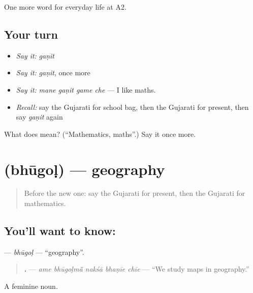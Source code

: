 \begin{grammarlens}[title={What you've built}]
One more word for everyday life at A2.
\end{grammarlens}

\subsection*{Your turn}
\begin{itemize}
\raggedright
  \item \emph{Say it:} \emph{gaṇit}
  \item \emph{Say it:} \emph{gaṇit}, once more
  \item \emph{Say it:} \emph{mane gaṇit game che} — I like maths.
  \item \emph{Recall:} say the Gujarati for school bag, then the Gujarati for present, then say \emph{gaṇit} again
\end{itemize}

\begin{tcolorbox}[breakable,colback=teal!4,colframe=teal!35!black,title={Before you move on}]
What does  mean? (\textquotedblleft{}Mathematics, maths\textquotedblright{}.) Say it once more.
\end{tcolorbox}
\section[\texorpdfstring{\gu{ભૂગોળ} (bhūgoḷ)}{ભૂગોળ (bhūgoḷ)}]{ (bhūgoḷ) — geography}

\label{lesson:GU-C244-bhugol}



\begin{quote}
Before the new one: say the Gujarati for present, then the Gujarati for mathematics.
\end{quote}

\subsection*{You'll want to know: }
\textbf{} — \emph{bhūgoḷ} — \textquotedblleft{}geography\textquotedblright{}.

\begin{quote}
\textbf{    .} — \emph{ame bhūgoḷmā̃ nakśā bhaṇīe chīe} — \textquotedblleft{}We study maps in geography.\textquotedblright{}
\end{quote}

A feminine noun.

